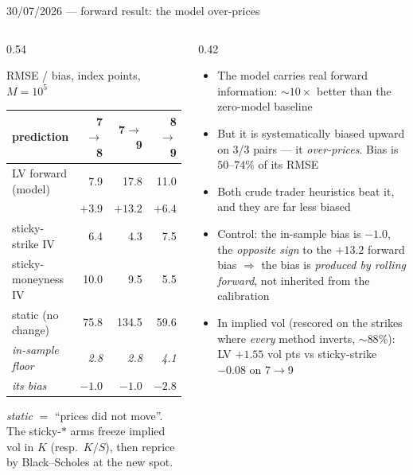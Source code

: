 \documentclass[aspectratio=169,11pt]{beamer}
\newcommand{\gold}[1]{{\color{ntugold}#1}}
\newcommand{\red}[1]{{\color{ntured}#1}}
\begin{document}
\begin{frame}{30/07/2026 --- forward result: the model over-prices}
  \begin{columns}[T]
    \begin{column}{0.54\linewidth}
      \begin{center}\scriptsize
      RMSE / bias, index points, $M=10^5$
      \vspace{0.1cm}

      \begin{tabular}{lrrr}
        \toprule
        prediction & 7$\to$8 & 7$\to$9 & 8$\to$9 \\
        \midrule
        \red{LV forward (model)} & \red{7.9} & \red{17.8} & \red{11.0} \\
                                 & \red{$+3.9$} & \red{$+13.2$} & \red{$+6.4$} \\
        \midrule
        sticky-strike IV & 6.4 & \gold{4.3} & 7.5 \\
        sticky-moneyness IV & 10.0 & 9.5 & \gold{5.5} \\
        \midrule
        static (no change) & 75.8 & 134.5 & 59.6 \\
        \midrule
        \emph{in-sample floor} & \emph{2.8} & \emph{2.8} & \emph{4.1} \\
        \emph{\quad its bias} & \emph{$-1.0$} & \emph{$-1.0$} & \emph{$-2.8$} \\
        \bottomrule
      \end{tabular}
      \end{center}
      \vspace{0.1cm}
      {\tiny \emph{static} $=$ ``prices did not move''. The sticky-$\ast$ arms freeze
      implied vol in $K$ (resp.\ $K/S$), then reprice by Black--Scholes at the new spot.}
    \end{column}
    \begin{column}{0.42\linewidth}
      \begin{itemize}\scriptsize
        \item \gold{The model carries real forward information}: $\sim\!10\times$ better
              than the zero-model baseline
        \item But it is \red{systematically biased upward} on 3/3 pairs --- it
              \emph{over-prices}. Bias is $50$--$74\%$ of its RMSE
        \item Both crude trader heuristics beat it, and they are far less biased
        \item \red{Control:} the in-sample bias is $-1.0$, the \emph{opposite sign} to the
              $+13.2$ forward bias $\Rightarrow$ the bias is \emph{produced by rolling
              forward}, not inherited from the calibration
        \item In implied vol (rescored on the strikes where \emph{every} method inverts,
              $\sim\!88\%$): LV $+1.55$ vol pts vs sticky-strike $-0.08$ on 7$\to$9
      \end{itemize}
    \end{column}
  \end{columns}
\end{frame}
\end{document}

